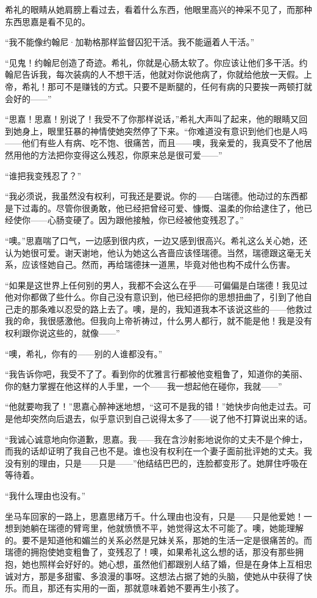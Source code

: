 \par 希礼的眼睛从她肩膀上看过去，看着什么东西，他眼里高兴的神采不见了，而那种东西思嘉是看不见的。
\par “我不能像约翰尼·加勒格那样监督囚犯干活。我不能逼着人干活。”
\par “见鬼！约翰尼创造了奇迹。希礼，你就是心肠太软了。你应该让他们多干活。约翰尼告诉我，每次装病的人不想干活，他就对你说他病了，你就给他放一天假。上帝，希礼！那可不是赚钱的方式。只要不是断腿的，任何有病的只要挨一两顿打就会好的——”
\par “思嘉！思嘉！别说了！我受不了你那样说话，”希礼大声叫了起来，他的眼睛又回到她身上，眼里狂暴的神情使她突然停了下来。“你难道没有意识到他们也是人吗——他们有些人有病、吃不饱、很痛苦，而且——噢，我亲爱的，我真受不了他居然用他的方法把你变得这么残忍，你原来总是很可爱——”
\par “谁把我变残忍了？”
\par “我必须说，我虽然没有权利，可我还是要说。你的——白瑞德。他动过的东西都是下过毒的。尽管你很勇敢，他已经把曾经可爱、慷慨、温柔的你给逮住了，他已经使你——心肠变硬了。因为跟他接触，你已经被他变残忍了。”
\par “噢。”思嘉喘了口气，一边感到很内疚，一边又感到很高兴。希礼这么关心她，还认为她很可爱。谢天谢地，他认为她这么吝啬应该怪瑞德。当然，瑞德跟这毫无关系，应该怪她自己。然而，再给瑞德抹一道黑，毕竟对他也构不成什么伤害。
\par “如果是这世界上任何别的男人，我都不会这么在乎——可偏偏是白瑞德！我见过他对你都做了些什么。你自己没有意识到，他已经把你的思想扭曲了，引到了他自己走的那条难以忍受的路上去了。噢，是的，我知道我本不该说这些的——他救过我的命，我很感激他。但我向上帝祈祷过，什么男人都行，就不能是他！我是没有权利跟你说这些的，就像——”
\par “噢，希礼，你有的——别的人谁都没有。”
\par “我告诉你吧，我受不了了。看到你的优雅言行都被他变粗鲁了，知道你的美丽、你的魅力掌握在他这样的人手里，一个——我一想起他在碰你，我就——”
\par “他就要吻我了！”思嘉心醉神迷地想，“这可不是我的错！”她快步向他走过去。可是他却突然向后退去，似乎意识到自己说得太多了——说了他不打算说出来的话。
\par “我诚心诚意地向你道歉，思嘉。我——我在含沙射影地说你的丈夫不是个绅士，而我的话却证明了我自己也不是。谁也没有权利在一个妻子面前批评她的丈夫。我没有别的理由，只是——只是——”他结结巴巴的，连脸都变形了。她屏住呼吸在等待着。
\par “我什么理由也没有。”
\par 坐马车回家的一路上，思嘉思绪万千。什么理由也没有，只是——只是他爱她！一想到她躺在瑞德的臂弯里，他就愤愤不平，她觉得这太不可能了。噢，她能理解的。要不是知道他和媚兰的关系必然是兄妹关系，那她的生活一定是很痛苦的。而瑞德的拥抱使她变粗鲁了，变残忍了！噢，如果希礼这么想的话，那没有那些拥抱，她也照样会好好的。她心想，虽然他们都跟别人结了婚，但是在身体上互相忠诚对方，那是多甜蜜、多浪漫的事呀。这想法占据了她的头脑，使她从中获得了快乐。而且，那还有实用的一面，那就意味着她不要再生小孩了。

